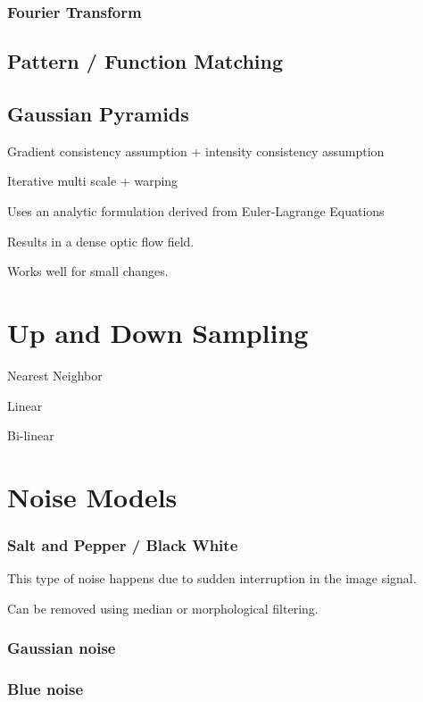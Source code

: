 \subsubsection{Fourier Transform}

\subsection{Pattern / Function Matching }

\subsection{Gaussian Pyramids}



Gradient consistency assumption + intensity consistency assumption

Iterative multi scale + warping

Uses an analytic formulation derived from Euler-Lagrange Equations

Results in a dense optic flow field.

Works well for small changes.

\section{Up and Down Sampling}


Nearest Neighbor

Linear

Bi-linear

\section{Noise Models}

\subsubsection{Salt and Pepper / Black White}

This type of noise happens due to sudden interruption in the image signal.

Can be removed using median or morphological filtering.

\subsubsection{Gaussian noise}

\subsubsection{Blue noise}

